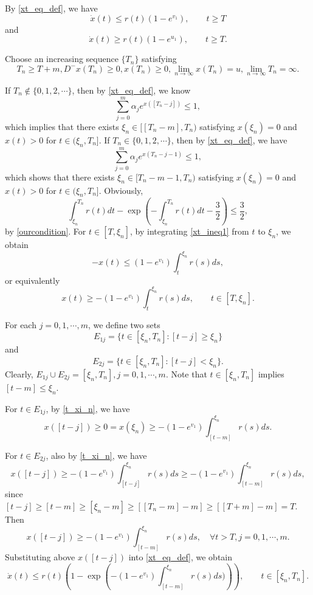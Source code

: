 \documentclass{HZNUMCM}
\begin{document}
By \eqref{xt_eq_def}, we have
\begin{equation}\label{xt_ineq1}
{\dot x(t)}\leqslant  r(t)   (1-e^{ v_1}),\qquad t\geqslant T
\end{equation}
and
\begin{equation}\label{xt_ineq2}
{\dot x(t)}\geqslant r(t)  (1-e^{ u_1}),\qquad t\geqslant T.
\end{equation}

Choose an increasing sequence $\{T_n\}$ satisfying
$$
T_n\geqslant T+m, D^- x(T_n)\geqslant 0, x(T_n)\geqslant 0,\lim_{n\rightarrow\infty}x(T_n)=u, \lim_{n\rightarrow \infty}T_n=\infty.
$$

If $T_n\notin\{0,1,2,\cdots\}$, then by \eqref{xt_eq_def}, we know
$$
\sum_{j=0}^{m} \alpha_je^{x([T_n-j])}\leqslant1,
$$
which implies that there exists $\xi_n\in [[T_n-m],T_n)$ satisfying $x(\xi_n)=0$ and $x(t)>0$ for $t\in(\xi_n,T_n]$.
If $T_n\in\{0,1,2,\cdots\}$, then by \eqref{xt_eq_def}, we have
$$
\sum_{j=0}^{m} \alpha_je^{x(T_n-j-1)}\leqslant1,
$$which shows that there exists $\xi_n\in [T_n-m-1,T_n)$ satisfying $x(\xi_n)=0$ and $x(t)>0$ for $t\in(\xi_n,T_n]$. Obviously,
\begin{equation}
\int_{\xi_n}^{T_n}r(t)dt-\exp(-\int_{\xi_n}^{T_n}r(t)dt-\frac 3 2)\leqslant \frac 3 2,
\end{equation}
by \eqref{ourcondition}. For $t\in[T,\xi_n]$, by integrating \eqref{xt_ineq1} from $t$ to $\xi_n$, we obtain
$$
-x(t) \leqslant (1-e^{v_1})\int_t^{\xi_n}r(s)ds,
$$
or equivalently
\begin{equation}\label{t_xi_n}
x(t)\geqslant -(1-e^{v_1})\int_t^{\xi_n}r(s)ds,\qquad t\in[T,\xi_n].
\end{equation}

For each $j=0,1,\cdots,m$, we define two sets
$$
E_{1j}=\{t\in[\xi_n,T_n]:[t-j]\geqslant \xi_n\}
$$and$$
E_{2j}=\{t\in[\xi_n,T_n]:[t-j]< \xi_n\}.
$$
Clearly, $E_{1j}\cup E_{2j}=[\xi_n,T_n], j=0,1,\cdots,m$. Note that $t\in[\xi_n,T_n]$ implies $[t-m]\leqslant\xi_n$.

For $t\in E_{1j}$, by \eqref{t_xi_n}, we have
$$
x([t-j])\geqslant 0= x(\xi_n)\geqslant  -(1-e^{v_1})\int_{[t-m]}^{\xi_n}r(s)ds.
$$

For $t\in E_{2j}$, also by \eqref{t_xi_n}, we have
$$
x([t-j])\geqslant  -(1-e^{v_1})\int_{[t-j]}^{\xi_n}r(s)ds\geqslant-(1-e^{v_1})\int_{[t-m]}^{\xi_n}r(s)ds,
$$
since $[t-j]\geqslant [t-m]\geqslant [\xi_n-m]\geqslant [[T_n-m]-m]\geqslant [[T+m]-m]=T$.
Then
$$
x([t-j])\geqslant-(1-e^{v_1})\int_{[t-m]}^{\xi_n}r(s)ds,\quad \forall t>T,j=0,1,\cdots,m.
$$
Substituting above $x([t-j])$ into \eqref{xt_eq_def}, we obtain
\begin{equation}\label{xt_eq_def_1}
{\dot x(t)}\leqslant r(t)(1-\exp({-(1-e^{v_1})\int_{[t-m]}^{\xi_n}r(s)ds)})),\qquad t\in[\xi_n,T_n].
\end{equation}
\end{document}
